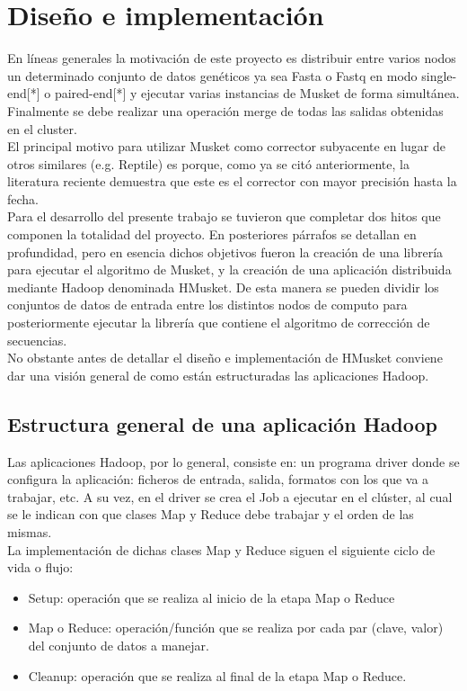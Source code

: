 \documentclass[conference]{IEEEtran}
\begin{document}
\section{Diseño e implementación}

En líneas generales la motivación de este proyecto es distribuir entre varios nodos un determinado conjunto de datos genéticos ya sea Fasta o Fastq en modo single-end[*] o paired-end[*] y ejecutar varias instancias de Musket de forma simultánea. Finalmente se debe realizar una operación merge de todas las salidas obtenidas en el cluster.\\
El principal motivo para utilizar Musket como corrector subyacente en lugar de otros similares (e.g. Reptile) es porque, como ya se citó anteriormente, la literatura reciente demuestra que este es el corrector con mayor precisión hasta la fecha.\\

Para el desarrollo del presente trabajo se tuvieron que completar dos hitos que componen la totalidad del proyecto. En posteriores párrafos se detallan en profundidad, pero en esencia dichos objetivos fueron la creación de una librería para ejecutar el algoritmo de Musket, y la creación de una aplicación distribuida mediante Hadoop denominada HMusket. De esta manera se pueden dividir los conjuntos de datos de entrada entre los distintos nodos de computo para posteriormente ejecutar la librería que contiene el algoritmo de corrección de secuencias.\\

No obstante antes de detallar el diseño e implementación de HMusket conviene dar una visión general de como están estructuradas las aplicaciones Hadoop.

\subsection{Estructura general de una aplicación Hadoop}
Las aplicaciones Hadoop, por lo general, consiste en: un programa driver donde se configura la aplicación: ficheros de entrada, salida, formatos con los que va a trabajar, etc. A su vez, en el driver se crea el Job a ejecutar en el clúster, al cual se le indican con que clases Map y Reduce debe trabajar y el orden de las mismas.\\
La implementación de dichas clases Map y Reduce siguen el siguiente ciclo de vida o flujo:

\begin{itemize}
	\item Setup: operación que se realiza al inicio de la etapa Map o Reduce
	\item Map o Reduce: operación/función que se realiza por cada par (clave, valor) del conjunto de datos a manejar.
	\item Cleanup: operación que se realiza al final de la etapa Map o Reduce.
\end{itemize}
\end{document}
